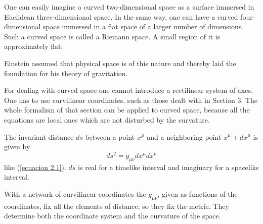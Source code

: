 One can easily imagine a curved two-dimensional space as a surface immersed in 
Euclidean three-dimensional space. In the same way, one can have a curved 
four-dimensional space immersed in a flat space of a larger number of 
dimensions. Such a curved space is called a Riemann space. A small region of it 
is approximately flat.

Einstein assumed that physical space is of this nature and thereby laid the 
foundation for his theory of gravitation.

For dealing with curved space one cannot introduce a rectilinear system of 
axes. One has to use curvilinear coordinates, such as those dealt with in 
Section 3. The whole formalism of that section can be applied to curved space, 
because all the equations are local ones which are not disturbed by the 
curvature.

The invariant distance $ds$ between a point $x^\mu$ and a neighboring point 
$x^\mu + dx^\mu$ is given by 
\[
 ds^2 = g_{\mu\nu}dx^\mu dx^\nu
\]
like (\ref{ecuacion 2.1}). $ds$ is real for a timelike interval and imaginary for a spacelike interval.

With a network of curvilinear coordinates the $g_{\mu\nu}$, given as functions 
of the coordinates, fix all the elements of distance; so they fix the metric. 
They determine both the coordinate system and the curvature of the space.